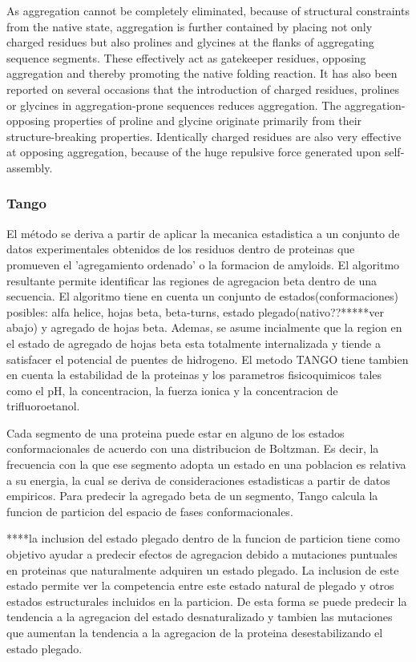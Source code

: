 As aggregation cannot be completely eliminated, because of structural constraints from the native state, aggregation is further contained by placing not only charged residues but also prolines and glycines at the flanks of aggregating sequence segments. These effectively act as gatekeeper residues, opposing aggregation and thereby promoting the native folding reaction. It has also been reported on several occasions that the introduction of charged residues, prolines or glycines in aggregation-prone sequences reduces aggregation.
The aggregation-opposing properties of proline and glycine originate primarily from their
structure-breaking properties. Identically charged residues are also very effective at opposing aggregation, because of the huge repulsive force generated upon self-assembly.




\subsubsection{Tango}

El método se deriva a partir de aplicar la mecanica estadistica a un conjunto de datos experimentales obtenidos de los residuos dentro de proteinas que promueven el 'agregamiento ordenado' o la formacion de amyloids. 
El algoritmo resultante permite identificar las regiones de agregacion beta dentro de una secuencia.
El algoritmo tiene en cuenta un conjunto de estados(conformaciones) posibles: alfa helice, hojas beta, beta-turns, estado plegado(nativo??*****ver abajo) y agregado de hojas beta.
Ademas, se asume incialmente que la region en el estado de agregado de hojas beta esta totalmente internalizada y tiende a satisfacer el potencial de puentes de hidrogeno. 
El metodo TANGO tiene tambien en cuenta la estabilidad de la proteinas y los parametros fisicoquimicos tales como el pH, la concentracion, la fuerza ionica y la concentracion de trifluoroetanol.

Cada segmento de una proteina puede estar en alguno de los estados conformacionales de acuerdo con una distribucion de Boltzman. 
Es decir, la frecuencia con la que ese segmento adopta un estado en una poblacion es relativa a su energia, la cual se deriva de consideraciones estadisticas a partir de datos empiricos.  
Para predecir la agregado beta de un segmento, Tango calcula la funcion de particion del espacio de fases conformacionales.


****la inclusion del estado plegado dentro de la funcion de particion tiene como objetivo ayudar a predecir efectos de agregacion debido a mutaciones puntuales en proteinas que naturalmente adquiren un estado plegado. La inclusion de este estado permite ver la competencia entre este estado natural de plegado y otros estados estructurales incluidos en la particion. De esta forma se puede predecir la tendencia a la agregacion del estado desnaturalizado y tambien las mutaciones que aumentan la tendencia a la agregacion de la proteina desestabilizando el estado plegado.









